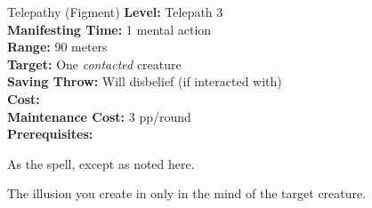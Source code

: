 {Telepathy (Figment)}
{
    \textbf{Level:}
    Telepath 3\\
    \textbf{Manifesting Time:}
    1 mental action\\
    \textbf{Range:}
    90 meters\\
    \textbf{Target:}
    One \emph{contacted} creature\\
    \textbf{Saving Throw:}
    Will disbelief (if interacted with)\\
    \textbf{Cost:}
    \\
    \textbf{Maintenance Cost:}
    3 pp/round\\
    \textbf{Prerequisites:}
    \\
}
{
    As the  spell, except as noted here.

    The illusion you create in only in the mind of the target creature.
}
